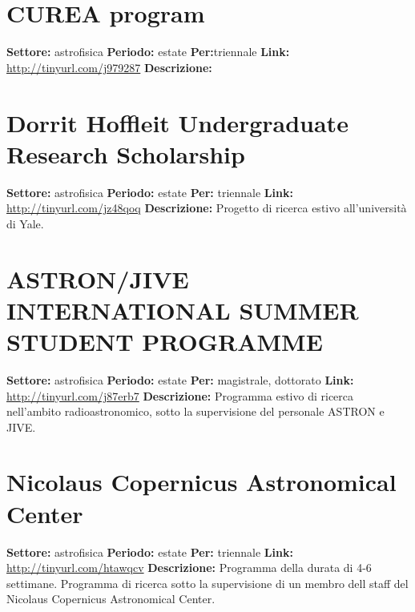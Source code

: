 \documentclass[a4paper,10pt]{article}
\begin{document}
\section{CUREA program}
\textbf{Settore:} astrofisica\newline
\textbf{Periodo:} estate \newline
\textbf{Per:}triennale\newline
\textbf{Link:} \url{http://tinyurl.com/j979287} \newline
\textbf{Descrizione:}  

\section{Dorrit Hoffleit Undergraduate Research Scholarship}
\textbf{Settore:} astrofisica\newline
\textbf{Periodo:} estate\newline
\textbf{Per:} triennale\newline
\textbf{Link:} \url{http://tinyurl.com/jz48qoq} \newline
\textbf{Descrizione:} Progetto di ricerca estivo all’università di Yale.  

\section{ASTRON/JIVE INTERNATIONAL SUMMER STUDENT PROGRAMME}  
\textbf{Settore:} astrofisica \newline
\textbf{Periodo:} estate \newline
\textbf{Per:} magistrale, dottorato\newline
\textbf{Link:} \url{http://tinyurl.com/j87erb7} \newline
\textbf{Descrizione:} Programma estivo di ricerca nell'ambito radioastronomico, sotto la supervisione del personale ASTRON e JIVE.  

\section{Nicolaus Copernicus Astronomical Center} 
\textbf{Settore:} astrofisica \newline
\textbf{Periodo:} estate\newline
\textbf{Per:} triennale\newline
\textbf{Link:} \url{http://tinyurl.com/htawqcv} \newline
\textbf{Descrizione:} Programma della durata di 4-6 settimane. Programma di ricerca sotto la supervisione di un membro dell staff del Nicolaus Copernicus Astronomical Center.  
\end{document}
